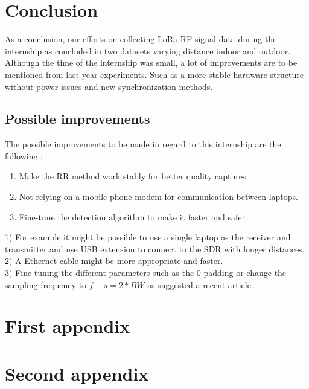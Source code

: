 \documentclass[a4paper, 12pt]{article}
\begin{document}
\section{Conclusion}\label{conclu}
As a conclusion, our efforts on collecting LoRa RF signal data during the internship as concluded in two datasets varying distance indoor and outdoor.
Although the time of the internship was small, a lot of improvements are to be mentioned from last year experiments.
Such as a more stable hardware structure without power issues and new synchronization methods.


\subsection{Possible improvements}
The possible improvements to be made in regard to this internship are the following :

\begin{enumerate}
  \item Make the RR method work stably for better quality captures. 
  \item Not relying on a mobile phone modem for communication between laptops.
  \item Fine-tune the detection algorithm to make it faster and safer.
\end{enumerate}
1) For example it might be possible to use a single laptop as the receiver and transmitter and use USB extension to connect to the SDR with longer distances. \\
2) A Ethernet cable might be more appropriate and faster.\\
3) Fine-tuning the different parameters such as the 0-padding or change the sampling frequency to $f-s = 2*BW$ as suggested a recent article \cite{CSSTuto}.


\printbibliography

\newpage
\begin{appendices}

\section{First appendix}
\section{Second appendix}
  
\end{appendices}

\listoftodos[Notes]
\end{document}
